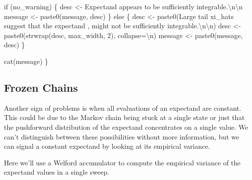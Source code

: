 \documentclass[
  letterpaper,
  DIV=11,
  numbers=noendperiod]{scrartcl}
\newenvironment{Shaded}{\begin{snugshade}}{\end{snugshade}}
\newcommand{\CharTok}[1]{\textcolor[rgb]{0.13,0.47,0.30}{#1}}
\newcommand{\ControlFlowTok}[1]{\textcolor[rgb]{0.00,0.23,0.31}{#1}}
\newcommand{\DecValTok}[1]{\textcolor[rgb]{0.68,0.00,0.00}{#1}}
\newcommand{\NormalTok}[1]{\textcolor[rgb]{0.00,0.23,0.31}{#1}}
\newcommand{\OperatorTok}[1]{\textcolor[rgb]{0.37,0.37,0.37}{#1}}
\newcommand{\StringTok}[1]{\textcolor[rgb]{0.13,0.47,0.30}{#1}}
\begin{document}
\begin{Shaded}
\begin{Highlighting}[]
  \ControlFlowTok{if}\NormalTok{ (no\_warning) \{}
\NormalTok{    desc }\OperatorTok{\textless{}{-}} \StringTok{\textquotesingle{}Expectand appears to be sufficiently integrable.}\CharTok{\textbackslash{}n\textbackslash{}n}\StringTok{\textquotesingle{}}
\NormalTok{    message }\OperatorTok{\textless{}{-}}\NormalTok{ paste0(message, desc)}
\NormalTok{  \} }\ControlFlowTok{else}\NormalTok{ \{}
\NormalTok{    desc }\OperatorTok{\textless{}{-}}\NormalTok{ paste0(}\StringTok{\textquotesingle{}Large tail xi\_hats suggest that the expectand \textquotesingle{}}\NormalTok{,}
                   \StringTok{\textquotesingle{}might not be sufficiently integrable.}\CharTok{\textbackslash{}n\textbackslash{}n}\StringTok{\textquotesingle{}}\NormalTok{)}
\NormalTok{    desc }\OperatorTok{\textless{}{-}}\NormalTok{ paste0(strwrap(desc, max\_width, }\DecValTok{2}\NormalTok{), collapse}\OperatorTok{=}\StringTok{\textquotesingle{}}\CharTok{\textbackslash{}n}\StringTok{\textquotesingle{}}\NormalTok{)}
\NormalTok{    message }\OperatorTok{\textless{}{-}}\NormalTok{ paste0(message, desc)}
\NormalTok{  \}}
  
\NormalTok{  cat(message)}
\NormalTok{\}}
\end{Highlighting}
\end{Shaded}

\hypertarget{frozen-chains}{%
\subsection{Frozen Chains}\label{frozen-chains}}

Another sign of problems is when all evaluations of an expectand are
constant. This could be due to the Markov chain being stuck at a single
state or just that the pushforward distribution of the expectand
concentrates on a single value. We can't distinguish between these
possibilities without more information, but we can signal a constant
expectand by looking at its empirical variance.

Here we'll use a Welford accumulator to compute the empirical variance
of the expectand values in a single sweep.
\end{document}
